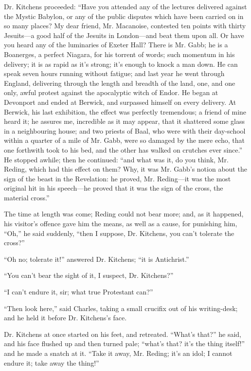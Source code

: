 Dr. Kitchens proceeded: ``Have you attended any of the lectures
delivered against the Mystic Babylon, or any of the public disputes
which have been carried on in so many places? My dear friend, Mr.
Macanoise, contested ten points with thirty Jesuits—a good half of
the Jesuits in London—and beat them upon all. Or have you heard any
of the luminaries of Exeter Hall? There is Mr. Gabb; he is a Boanerges,
a perfect Niagara, for his torrent of words; such momentum in his
delivery; it is as rapid as it's strong; it's enough to knock a man
down. He can speak seven hours running without fatigue; and last year
he went through England, delivering through the length and
breadth of the land, one, and one only, awful protest against the
apocalyptic witch of Endor. He began at Devonport and ended at
Berwick, and surpassed himself on every delivery. At Berwick, his last
exhibition, the effect was perfectly tremendous; a friend of mine
heard it; he assures me, incredible as it may appear, that it
shattered some glass in a neighbouring house; and two priests of Baal,
who were with their day-school within a quarter of a mile of Mr. Gabb,
were so damaged by the mere echo, that one forthwith took to his bed,
and the other has walked on crutches ever since.'' He stopped
awhile; then he continued: ``and what was it, do you think, Mr.
Reding, which had this effect on them? Why, it was Mr. Gabb's notion
about the sign of the beast in the Revelation: he proved, Mr. Reding—it
was the most original hit in his speech—he proved that it was the
sign of the cross, the material cross.''

The time at length was come; Reding could not bear more; and, as it
happened, his visitor's offence gave him the means, as well as a
cause, for punishing him, ``Oh,'' he said suddenly, ``then
I suppose, Dr. Kitchens, you can't tolerate the cross?''

``Oh no; tolerate it!'' answered Dr. Kitchens; ``it is
Antichrist.''

``You can't bear the sight of it, I suspect, Dr.
Kitchens?''

``I can't endure it, sir; what true Protestant can?''

``Then look here,'' said Charles, taking a small crucifix
out of his writing-desk; and he held it before Dr. Kitchens's face.

Dr. Kitchens at once started on his feet, and retreated. ``What's
that?'' he said, and his face flushed up and then turned pale;
``what's that? it's the thing itself!'' and he made a snatch
at it. ``Take it away, Mr. Reding; it's an idol; I cannot endure
it; take away the thing!''

